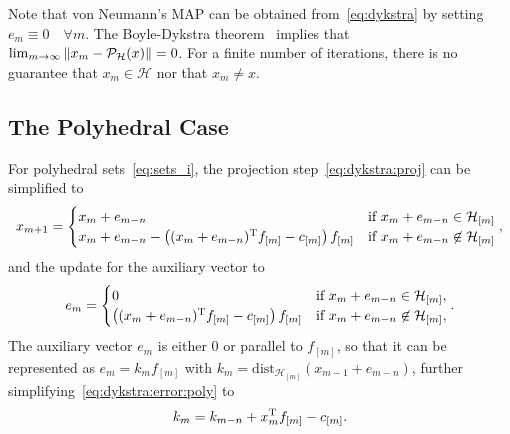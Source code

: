 \documentclass[hidelinks]{article}
\begin{document}
Note that von Neumann's MAP can be obtained from~\eqref{eq:dykstra} by setting $e_m \equiv 0\quad\forall m$. The Boyle-Dykstra theorem~\cite{DYKSTRA} implies that $\lim_{m\rightarrow\infty}\Vert x_m-\mathcal{P}_\mathcal{H}(x) \Vert=0$. For a finite number of iterations, there is no guarantee that $x_m\in\mathcal{H}$ nor that $x_m\neq x$. 

\subsection{The Polyhedral Case}

For polyhedral sets~\eqref{eq:sets_i}, the projection step~\eqref{eq:dykstra:proj} can be simplified to
\begin{align}\label{eq:dykstra:proj:poly}
x_{m+1}=
\begin{cases}
x_{m}+e_{m-n} & \text{if } x_{m}+e_{m-n}\in\mathcal{H}_{[m]}\\
x_{m}+e_{m-n} - \left((x_{m}+e_{m-n})^{\text{T}} f_{[m]} - c_{[m]}\right) f_{[m]} & \text{if } x_{m}+e_{m-n}\not\in\mathcal{H}_{[m]}
\end{cases},
\end{align}
and the update for the auxiliary vector to
\begin{align}\label{eq:dykstra:error:poly}
e_m=
\begin{cases}
0 & \text{if } x_{m}+e_{m-n}\in\mathcal{H}_{[m]},\\
\left((x_{m}+e_{m-n})^{\text{T}} f_{[m]} - c_{[m]}\right) f_{[m]} & \text{if } x_{m}+e_{m-n}\not\in\mathcal{H}_{[m]},
\end{cases}.
\end{align}
The auxiliary vector $e_m$ is either $0$ or parallel to $f_{[m]}$, so that it can be represented as $e_m = k_m f_{[m]}$ with $k_m=\text{dist}_{\mathcal{H}_{[m]}}(x_{m-1}+e_{m-n})$, further simplifying~\eqref{eq:dykstra:error:poly} to
\begin{align}\label{eq:km}
k_m = k_{m-n} + x_m^{\text{T}} f_{[m]} - c_{[m]}.
\end{align}
\end{document}
